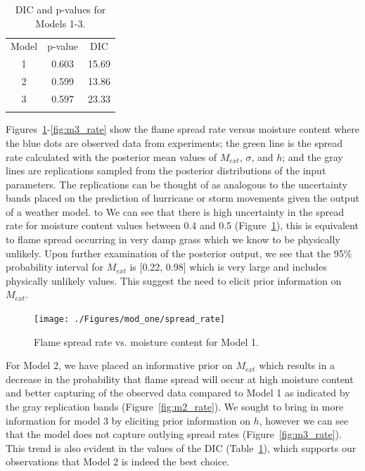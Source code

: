 \documentclass[11pt]{article}
\begin{document}
\begin{table}[h]
\caption{DIC and p-values for Models 1-3.}
\begin{center}
  \begin{tabular}{ccc}
    \hline\noalign{\smallskip}
    Model & p-value & DIC \\
    \noalign{\smallskip}\hline\noalign{\smallskip}
    1 & 0.603 & 15.69 \\
    2 & 0.599 & 13.86 \\ 
    3 & 0.597 & 23.33 \\ 
    \noalign{\smallskip}\hline
  \end{tabular}
\end{center}
\label{tab:dic}
\end{table}

Figures~\ref{fig:m1_rate}-\ref{fig:m3_rate} show the flame spread rate versus moisture content where the blue dots are observed data from experiments; the green line is the spread rate calculated with the posterior mean values of $M_{ext}$, $\sigma$, and $h$; and the gray lines are replications sampled from the posterior distributions of the input parameters. The replications can be thought of as analogous to the uncertainty bands placed on the prediction of hurricane or storm movements given the output of a weather model. to We can see that there is high uncertainty in the spread rate for moisture content values between 0.4 and 0.5 (Figure~\ref{fig:m1_rate}), this is equivalent to flame spread occurring in very damp grass which we know to be physically unlikely. Upon further examination of the posterior output, we see that the 95\% probability interval for $M_{ext}$ is [0.22, 0.98] which is very large and includes physically unlikely values. This suggest the need to elicit prior information on $M_{ext}$.

\begin{figure}[h]
\begin{center}
\texttt{[image: ./Figures/mod\_one/spread\_rate]}
\end{center}
\caption{Flame spread rate vs. moisture content for Model 1.}
\label{fig:m1_rate} 
\end{figure}

For Model 2, we have placed an informative prior on $M_{ext}$ which results in a decrease in the probability that flame spread will occur at high moisture content and better capturing of the observed data compared to Model 1 as indicated by the gray replication bands (Figure~\ref{fig:m2_rate}). We sought to bring in more information for model 3 by eliciting prior information on $h$, however we can see that the model does not capture outlying spread rates (Figure~\ref{fig:m3_rate}). This trend is also evident in the values of the DIC (Table~\ref{tab:dic}), which supports our observations that Model 2 is indeed the best choice. 
\end{document}
